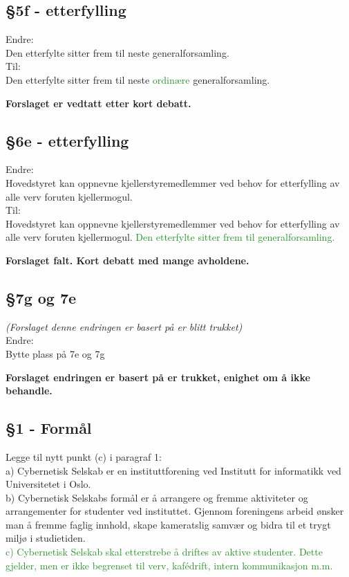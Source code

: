 \documentclass[10pt,norsk,a4paper,usenames,dvipsnames]{article}
\begin{document}
    \subsection{§5f - etterfylling}
        Endre:
        \\Den etterfylte sitter frem til neste generalforsamling.
        \\Til:
        \\Den etterfylte sitter frem til neste \textcolor{ForestGreen}{ordinære} generalforsamling.
        
        \textbf{Forslaget er vedtatt etter kort debatt.}
        
    \subsection{§6e - etterfylling}
        Endre:
        \\Hovedstyret kan oppnevne kjellerstyremedlemmer ved behov for etterfylling av alle verv foruten kjellermogul.
        \\Til:
        \\Hovedstyret kan oppnevne kjellerstyremedlemmer ved behov for etterfylling av alle verv foruten kjellermogul. \textcolor{ForestGreen}{Den etterfylte sitter frem til generalforsamling.}
        
        \textbf{Forslaget falt. Kort debatt med mange avholdene.}

    \subsection{§7g og 7e}
    
        \small\textit{(Forslaget denne endringen er basert på er blitt trukket)}\\\normalsize
        Endre:
        \\Bytte plass på 7e og 7g
        
        \textbf{Forslaget endringen er basert på er trukket, enighet om å ikke behandle.}
    
    \subsection{§1 - Formål}
        Legge til nytt punkt (c) i paragraf 1:
        \\a) Cybernetisk Selskab er en instituttforening ved Institutt for informatikk ved Universitetet i Oslo.
        \\b) Cybernetisk Selskabs formål er å arrangere og fremme aktiviteter og arrangementer for studenter ved instituttet. Gjennom foreningens arbeid ønsker man å fremme faglig innhold, skape kameratslig samvær og bidra til et trygt miljø i studietiden.
        \\\textcolor{ForestGreen}{c) Cybernetisk Selskab skal etterstrebe å driftes av aktive studenter. Dette gjelder, men er ikke begrenset til verv, kafédrift, intern kommunikasjon m.m.}
        
\end{document}
